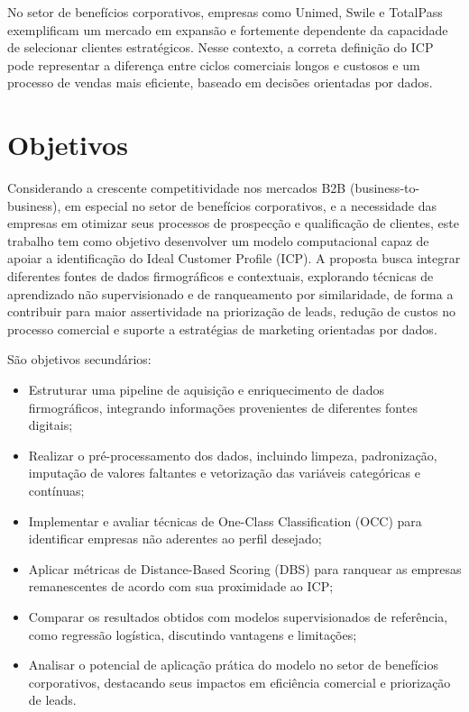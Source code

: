 No setor de benefícios corporativos, empresas como Unimed, Swile e TotalPass exemplificam um mercado em expansão e fortemente dependente da capacidade de selecionar clientes estratégicos. Nesse contexto, a correta definição do ICP pode representar a diferença entre ciclos comerciais longos e custosos e um processo de vendas mais eficiente, baseado em decisões orientadas por dados.

\section{Objetivos}

Considerando a crescente competitividade nos mercados B2B (business-to-business), em especial no setor de benefícios corporativos, e a necessidade das empresas em otimizar seus processos de prospecção e qualificação de clientes, este trabalho tem como objetivo desenvolver um modelo computacional capaz de apoiar a identificação do Ideal Customer Profile (ICP). A proposta busca integrar diferentes fontes de dados firmográficos e contextuais, explorando técnicas de aprendizado não supervisionado e de ranqueamento por similaridade, de forma a contribuir para maior assertividade na priorização de leads, redução de custos no processo comercial e suporte a estratégias de marketing orientadas por dados. 

São objetivos secundários: 

\begin{itemize}
    \item Estruturar uma pipeline de aquisição e enriquecimento de dados firmográficos, integrando informações provenientes de diferentes fontes digitais;
    \item Realizar o pré-processamento dos dados, incluindo limpeza, padronização, imputação de valores faltantes e vetorização das variáveis categóricas e contínuas;
    \item Implementar e avaliar técnicas de One-Class Classification (OCC) para identificar empresas não aderentes ao perfil desejado;
    \item Aplicar métricas de Distance-Based Scoring (DBS) para ranquear as empresas remanescentes de acordo com sua proximidade ao ICP;
    \item Comparar os resultados obtidos com modelos supervisionados de referência, como regressão logística, discutindo vantagens e limitações;
    \item Analisar o potencial de aplicação prática do modelo no setor de benefícios corporativos, destacando seus impactos em eficiência comercial e priorização de leads.
\end{itemize}

